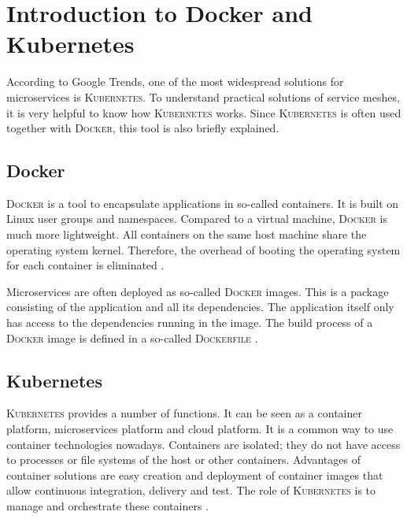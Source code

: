 \section{Introduction to Docker and Kubernetes}

According to Google Trends, one of the most widespread solutions for microservices is \textsc{Kubernetes}.
To understand practical solutions of service meshes, it is very helpful to know how \textsc{Kubernetes} works. Since \textsc{Kubernetes} is often used together with \textsc{Docker}, this tool is also briefly explained.

\subsection{Docker}

\textsc{Docker} is a tool to encapsulate applications in so-called containers. It is built on Linux user groups and namespaces. Compared to a virtual machine, \textsc{Docker} is much more lightweight. All containers on the same host machine share the operating system kernel. Therefore, the overhead of booting the operating system for each container is eliminated \cite[p. 220 ff.]{sm3}.

Microservices are often deployed as so-called \textsc{Docker} images. This is a package consisting of the application and all its dependencies. The application itself only has access to the dependencies running in the image. The build process of a \textsc{Docker} image is defined in a so-called \textsc{Dockerfile} \cite[p. 224]{sm3}.

\subsection{Kubernetes}

\textsc{Kubernetes} provides a number of functions. It can be seen as a container platform, microservices platform and cloud platform.
It is a common way to use container technologies nowadays. Containers are isolated; they do not have access to processes or file systems of the host or other containers.
Advantages of container solutions are easy creation and deployment of container images that allow continuous integration, delivery and test. The role of \textsc{Kubernetes} is to manage and orchestrate these containers \cite{k8s}.

